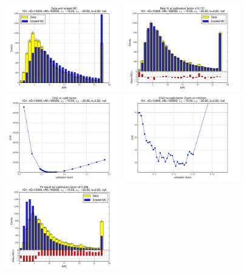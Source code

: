
 \begin{figure}[htbp] \begin{center} 
\includegraphics[width=0.45\textwidth]{../FIGURES/161/FIG_Data_and_scaled_MC.pdf} 
\includegraphics[width=0.45\textwidth]{../FIGURES/161/FIG_Best_fit_at_calibration_factor_of_0_721.pdf} 
\includegraphics[width=0.45\textwidth]{../FIGURES/161/FIG_Chi2_vs_calib_factor.pdf} 
\includegraphics[width=0.45\textwidth]{../FIGURES/161/FIG_Chi2_vs_calib_factor_Zoom_on_chi2min.pdf} 
\includegraphics[width=0.45\textwidth]{../FIGURES/161/FIG_Fit_result_for_calibration_factor_of_0_496.pdf} 

\end{center}
\end{figure}
